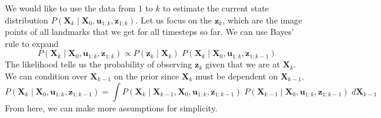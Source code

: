 \documentclass{article}
\begin{document}
  We would like to use the data from $1$ to $k$ to estimate the current state distribution $P (\mathbf{X}_k \mid \mathbf{X}_0, \mathbf{u}_{1:k}, \mathbf{z}_{1:k})$. Let us focus on the $\mathbf{z}_k$, which are the image points of all landmarks that we get for all timesteps so far. We can use Bayes' rule to expand 
  \begin{equation}
    P (\mathbf{X}_k \mid \mathbf{X}_0, \mathbf{u}_{1:k}, \mathbf{z}_{1:k}) \propto P(\mathbf{z}_k \mid \mathbf{X}_k) \; P(\mathbf{X}_k \mid \mathbf{X}_0, \mathbf{u}_{1:k}, \mathbf{z}_{1:k-1})
  \end{equation}
  The likelihood tells us the probability of observing $\mathbf{z}_k$ given that we are at $\mathbf{X}_k$. We can condition over $\mathbf{X}_{k-1}$ on the prior since $\mathbf{X}_k$ must be dependent on $\mathbf{X}_{k-1}$. 
  \begin{equation}
    P(\mathbf{X}_k \mid \mathbf{X}_0, \mathbf{u}_{1:k}, \mathbf{z}_{1:k-1}) = \int P(\mathbf{X}_k \mid \mathbf{X}_{k-1}, \mathbf{X}_0, \mathbf{u}_{1:k}, \mathbf{z}_{1: k-1}) \; P (\mathbf{X}_{k-1} \mid \mathbf{X}_0, \mathbf{u}_{1:k}, \mathbf{z}_{1:k-1}) \; d \mathbf{X}_{k-1}
  \end{equation}
  From here, we can make more assumptions for simplicity. 
\end{document}
